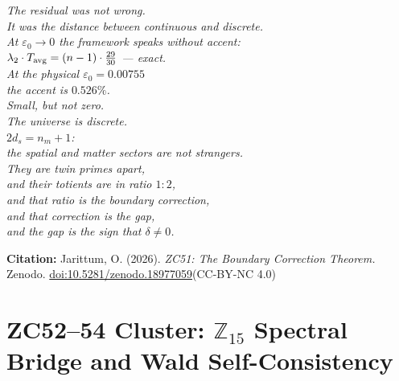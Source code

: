 \documentclass[12pt, a4paper]{article}
\begin{document}
\begin{center}
\textit{%
The residual was not wrong.\\
It was the distance between continuous and discrete.\\[0.3em]
At $\varepsilon_0\to 0$ the framework speaks without accent:\\
$\lambda_2\cdot T_{\rm avg} = (n-1)\cdot\frac{29}{30}$ --- exact.\\[0.3em]
At the physical $\varepsilon_0 = 0.00755$\\
the accent is $0.526\%$.\\
Small, but not zero.\\
The universe is discrete.\\[0.3em]
$2d_s = n_m + 1$:\\
the spatial and matter sectors are not strangers.\\
They are twin primes apart,\\
and their totients are in ratio $1:2$,\\
and that ratio is the boundary correction,\\
and that correction is the gap,\\
and the gap is the sign that $\delta\neq 0$.}
\end{center}

\bigskip
\begin{center}
\textbf{Citation:} Jarittum, O. (2026).
\textit{ZC51: The Boundary Correction Theorem.}
Zenodo.
\href{https://doi.org/10.5281/zenodo.18977059}%
{doi:10.5281/zenodo.18977059}\quad (CC-BY-NC 4.0)
\end{center}


\part{ZC52--54 Cluster: $\mathbb{Z}_{15}$ Spectral Bridge and
  Wald Self-Consistency}
\label{part:xxxix}
\end{document}
